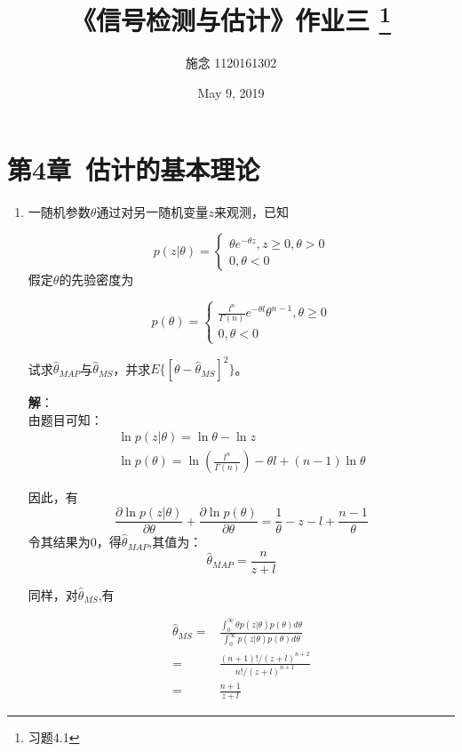 \documentclass{article}
\begin{document}
\title{《信号检测与估计》作业三 \footnote{习题4.1}}
\author{施念  1120161302}
\date{May 9, 2019}
\maketitle{}
\section{第4章\ 估计的基本理论}
\begin{enumerate}[1.]
\item 
一随机参数\(\theta\)通过对另一随机变量\(z\)来观测，已知

\[p(z|\theta ) = \left\{ {\begin{array}{*{20}{c}}
{\theta {e^{ - \theta z}},z \ge 0,\theta  > 0}\\
{0,\theta  < 0}
\end{array}} \right.\]
假定\(\theta\)的先验密度为

\[p(\theta ) = \left\{ {\begin{array}{*{20}{c}}
{\frac{{{l^n}}}{{\Gamma (n)}}{e^{ - \theta l}}{\theta ^{n - 1}},\theta  \ge 0}\\
{0,\theta  < 0}
\end{array}} \right.\]

试求\({{\hat \theta }_{MAP}}\)与\({{\hat \theta }_{MS}}\)，并求\(E\{ {[\theta  - {{\hat \theta }_{MS}}]^2}\} \)。

\textbf{解}：\\
由题目可知：
\[\begin{array}{l}
\ln p(z|\theta ) = \ln \theta  - \ln z\\
\ln p(\theta ) = \ln \left( {\frac{{{l^n}}}{{\Gamma (n)}}} \right) - \theta l + (n - 1)\ln \theta 
\end{array}\]

因此，有
\[\frac{{\partial \ln p(z|\theta )}}{{\partial \theta }} + \frac{{\partial \ln p(\theta )}}{{\partial \theta }} = \frac{1}{\theta } - z - l + \frac{{n - 1}}{\theta }\]
令其结果为0，得\({{\hat \theta }_{MAP}}\),其值为：
\[{{\hat \theta }_{MAP}} = \frac{n}{{z + l}}\]

同样，对\({{\hat \theta }_{MS}}\),有

\begin{equation*}
\begin{aligned}
{{\hat \theta }_{MS}} =& \frac{{\int_0^\infty  {\theta p(z|\theta )p(\theta )} d\theta }}{{\int_0^\infty  {p(z|\theta )p(\theta )} d\theta }}\\
=& \frac{{(n + 1)!}/{(z + l)}^{n + 2}}{n!/{(z + l)}^{n + 1}}\\
=& \frac{{n + 1}}{{z + l}}
\end{aligned}
\end{equation*}


\end{enumerate}
\end{document}
